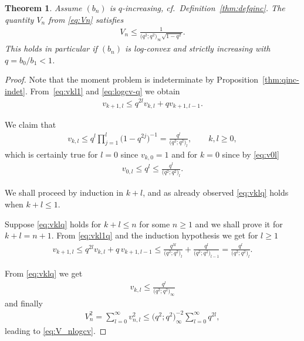 \documentclass[pdftex]{sigma}
\numberwithin{equation}{section}
\newtheorem{thm}{Theorem}[section]
\begin{document}
\begin{thm}\label{thm:V_nlogcv} Assume $(b_n)$ is $q$-increasing, cf.\ Definition~{\rm \ref{thm:defqinc}}. The quantity $V_n$ from \eqref{eq:Vn} satisfies
\begin{gather}\label{eq:V_nlogcv}
V_n\le\frac{1}{\big(q^2;q^2\big)_\infty\sqrt{1-q^2}}.
\end{gather}
This holds in particular if $(b_n)$ is log-convex and strictly increasing with $q=b_0/b_1<1$.
\end{thm}

\begin{proof} Note that the moment problem is indeterminate by Proposition~\ref{thm:qinc-indet}. From~\eqref{eq:vkl1} and \eqref{eq:logcv-q} we obtain
\begin{gather}\label{eq:vkl1q}
v_{k+1,l}\le q^{2l} v_{k,l}+qv_{k+1,l-1}.
\end{gather}

We claim that
\begin{gather}\label{eq:vklq}
v_{k,l}\le q^l\prod_{j=1}^l \big(1-q^{2j}\big)^{-1}=\frac{q^l}{\big(q^2;q^2\big)_l},\qquad k,l\ge 0,
\end{gather}
which is certainly true for $l=0$ since $v_{k,0}=1$ and for $k=0$ since by \eqref{eq:v0l}
\begin{gather*}
v_{0,l}\le q^l\le \frac{q^l}{\big(q^2;q^2\big)_l}.
\end{gather*}

 We shall proceed by induction in $k+l$, and as already observed \eqref{eq:vklq} holds when $k+l\le 1$.

Suppose \eqref{eq:vklq} holds for $k+l\le n$ for some $n\ge 1$ and we shall prove it for $k+l=n+1$. From \eqref{eq:vkl1q} and the induction hypothesis we get for $l\ge 1$
\begin{gather*}
v_{k+1,l} \le q^{2l}v_{k,l}+q\, v_{k+1,l-1} \le \frac{q^{3l}}{\big(q^2;q^2\big)_{l}}+\frac{q^{l}}{\big(q^2;q^2\big)_{l-1}}=\frac{q^{l}}{\big(q^2;q^2\big)_{l}}.
\end{gather*}

From \eqref{eq:vklq} we get
\begin{gather*}
v_{k,l}\le \frac{q^l}{\big(q^2;q^2\big)_\infty}
\end{gather*}
and finally
\begin{gather*}
V_n^2=\sum_{l=0}^\infty v_{n,l}^2\le \big(q^2;q^2\big)_\infty^{-2}\sum_{l=0}^\infty q^{2l},
\end{gather*}
leading to \eqref{eq:V_nlogcv}.
\end{proof}
\end{document}
